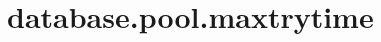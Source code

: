 \section{database.pool.maxtrytime}
\label{configuration:DatabasePoolMaxtrytime}
\AvailableInJavaOnly{\TODO}